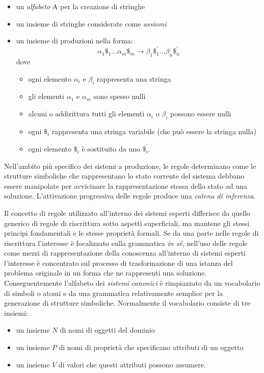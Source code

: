 \begin{itemize}
	\item un \emph{alfabeto} A per la creazione di stringhe
	\item un insieme di stringhe considerate come \emph{assiomi}
	\item un insieme di produzioni nella forma: 
	\[
	\alpha_1\$_1 \dots \alpha_m\$_m \rightarrow \beta_1\$_1^{'} \dots \beta_n\$_n^{'}
	\]	
	dove
	\begin{itemize}
		\item ogni elemento $\alpha_i$ e $\beta_i$ rappresenta una stringa
		\item gli elementi $\alpha_1$ e $\alpha_m$ sono spesso nulli
		\item alcuni o addirittura tutti gli elementi $\alpha_i$ o $\beta_i$ possono essere nulli
		\item ogni $\$_i$ rappresenta una stringa variabile (che può essere la stringa nulla)
		\item ogni elemento $\$_i$ è sostituito da uno $\$_i^{'}$.
	\end{itemize}
\end{itemize}

Nell'ambito più specifico dei sistemi a produzione, le regole determinano come le strutture simboliche che rappresentano lo stato corrente del sistema debbano essere manipolate per avvicinare la rappresentazione stessa dello stato ad una soluzione. L'attivazione progressiva delle regole produce una \emph{catena di inferenza}.

Il concetto di regole utilizzato all'interno dei sistemi esperti differisce da quello generico di regole di riscrittura sotto aspetti superficiali, ma mantene gli stessi principi fondamentali e le stesse proprietà formali.
Se da una parte nelle regole di riscrittura l'interesse è focalizzato sulla grammatica \emph{in sé}, nell'uso delle regole come mezzi di rappresentazione della conoscenza all'interno di sistemi esperti l'interesse è concentrato sul processo di trasformazione di una istanza del problema originale in un forma che ne rappresenti una soluzione.
Conseguentemente l'alfabeto dei \emph{sistemi canonici} è rimpiazzato da un vocabolario di simboli o atomi e da una grammatica relativamente semplice per la generazione di strutture simboliche. Normalmente il vocabolario consiste di tre insiemi:

\begin{itemize}
	\item un insieme $N$ di nomi di oggetti del dominio
	\item un insieme $P$ di nomi di proprietà che specificano attributi di un oggetto
	\item un insieme $V$ di valori che questi attributi possono assumere.
\end{itemize}

